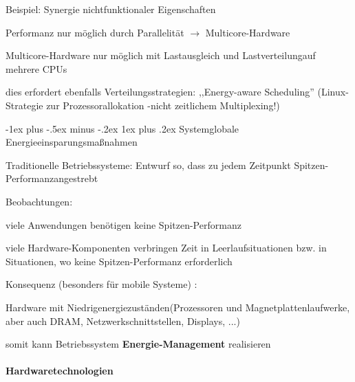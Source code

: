 \documentclass[a4paper]{article}
\makeatletter
\renewcommand{\subsubsection}{\@startsection{subsubsection}{3}{0mm}%
 {-1ex plus -.5ex minus -.2ex}%
 {1ex plus .2ex}%
 {\normalfont\small\bfseries}}
\makeatother
\begin{document}
\begin{multicols}{3}
\begin{itemize*}
        \item
        Beispiel: Synergie nichtfunktionaler Eigenschaften
        \begin{itemize*}
            \item Performanz nur möglich durch Parallelität $\rightarrow$  Multicore-Hardware
            \item Multicore-Hardware nur möglich mit Lastausgleich und Lastverteilungauf mehrere CPUs
            \item dies erfordert ebenfalls Verteilungsstrategien: ,,Energy-aware Scheduling'' (Linux-Strategie zur Prozessorallokation -nicht zeitlichem Multiplexing!)
        \end{itemize*}
    \end{itemize*}


    \subsubsection{Systemglobale
        Energieeinsparungsmaßnahmen}

    \begin{itemize*}
        \item
        Traditionelle Betriebssysteme: Entwurf so, dass zu jedem Zeitpunkt
        Spitzen-Performanzangestrebt
        \item
        Beobachtungen:
        \begin{itemize*}
            \item viele Anwendungen benötigen keine Spitzen-Performanz
            \item viele Hardware-Komponenten verbringen Zeit in Leerlaufsituationen bzw. in Situationen, wo keine Spitzen-Performanz erforderlich
        \end{itemize*}
        \item
        Konsequenz (besonders für mobile Systeme) :
        \begin{itemize*}
            \item Hardware mit Niedrigenergiezuständen(Prozessoren und Magnetplattenlaufwerke, aber auch DRAM, Netzwerkschnittstellen, Displays, ...)
            \item somit kann Betriebssystem \textbf{Energie-Management} realisieren
        \end{itemize*}
    \end{itemize*}


    \paragraph{Hardwaretechnologien}


\end{multicols}
\end{document}
